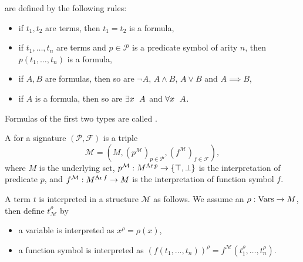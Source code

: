 \begin{definition}
   are defined by the following rules:
  \begin{itemize}
  \item if $t_1, t_2$ are terms, then $t_1 = t_2$ is a formula,
  \item if $t_1, \ldots, t_n$ are terms and $p \in \mathcal{P}$ is a predicate
	symbol of arity $n$, then $p(t_1, \ldots, t_n)$ is a formula,
  \item if $A, B$ are formulas, then so are
	$\lnot A$, $A \land B$, $A \lor B$ and $A \implies B$,
  \item if $A$ is a formula, then so are $\exists x \;\  A$ and $\forall x
	\;\  A$.
  \end{itemize}
  Formulas of the first two types are called .
\end{definition}

\begin{definition}
  A  for a signature $(\mathcal{P}, \mathcal{F})$ is a triple
  \[
	\mathcal{M} = \left( M, (p^{\mathcal{M}})_{p \in \mathcal{P}},
	  (f^{\mathcal{M}})_{f \in \mathcal{F}} \right),
  \]
  where $M$ is the underlying set, $p^{\mathcal{M}}: M^{\operatorname{Ar} p} \to \{\top,
  \bot\}$ is the interpretation of predicate $p$, and $f^{\mathcal{M}}: M^{\operatorname{Ar}
	f} \to M$ is the interpretation of function symbol $f$.
\end{definition}

A term $t$ is interpreted in a structure $\mathcal{M}$ as follows.
We assume an  $\rho: \operatorname{Vars} \to M$, then define
$t_{\mathcal{M}}^\rho$ by
\begin{itemize}
\item a variable is interpreted as $x^\rho = \rho(x)$,
\item a function symbol is interpreted as $\left( f(t_1, \ldots, t_n)
  \right)^\rho = f^{\mathcal{M}}(t_1^\rho, \ldots, t_n^\rho)$.
\end{itemize}

